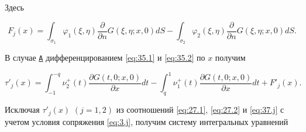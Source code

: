Здесь

\begin{equation}

{F_j}(x) =  \int _{{\sigma _1}} {{\varphi _1}(\xi ,\eta )\frac{\partial }{{\partial n}}G(\xi ,\eta ;x, 0)dS}  -  \int _{{\sigma _2}} {{\varphi _2}(\xi ,\eta )\frac{\partial }{{\partial n}}G(\xi ,\eta ;x, 0)dS}. 

\label{eq:36}

\end{equation}



\smallskip






В случае \hyperlink{abd:A}{\tt А} дифференцированием \eqref{eq:35.1} и \eqref{eq:35.2} по $x$ получим

 \begin{equation}

 \tau'_j(x) =  \int _{ - 1}^{ - q} {\nu _2^ + (t)\frac{{\partial G(t, 0;x, 0)}}{{\partial x}}dt}  -  \int _q^1 {\nu _1^+ (t)\frac{{\partial G(t, 0;x, 0)}}{{\partial x}}dt}  + {F'_j}(x). \label{eq:37.j}

 \end{equation}

Исключая ${\tau '_j}(x)$ $(j = 1, 2)$ из соотношений \eqref{eq:27.1}, \eqref{eq:27.2} и \eqref{eq:37.j} с учетом условия сопряжения \eqref{eq:3.j}, получим систему интегральных уравнений

